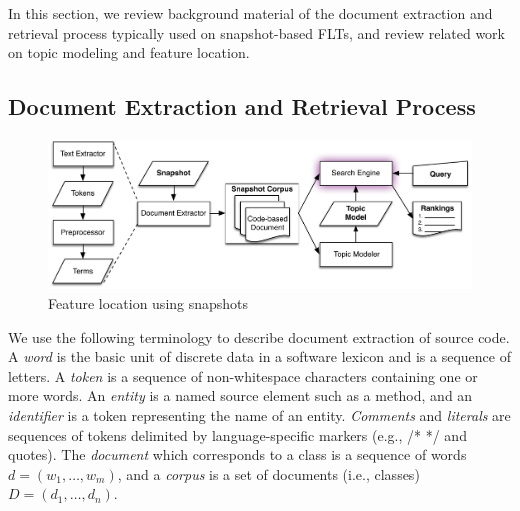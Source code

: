 

In this section, we review background material of the document extraction and retrieval process
typically used on snapshot-based FLTs,
and review related work on topic modeling and feature location.

\subsection{Document Extraction and Retrieval Process}

\begin{figure}
\vspace{2mm}
\centerline{\includegraphics[width=.75\textwidth]{figures/snapshot-flt}}
\caption{Feature location using snapshots}
\label{fig:snapshot}
\vspace{-2mm}
\end{figure}

We use the following terminology to describe document extraction of source code.
A \textit{word} is the basic unit of discrete data in a software lexicon and is a sequence of letters.
A \textit{token} is a sequence of non-whitespace characters containing one or more words.
An \textit{entity} is a named source element such as a method,
and an \textit{identifier} is a token representing the name of an entity.
\textit{Comments} and \textit{literals} are sequences of tokens delimited by language-specific markers (e.g., /* */ and quotes).
The \textit{document} which corresponds to a class is a sequence of words $d = (w_1, \ldots, w_m)$,
and a \textit{corpus} is a set of documents (i.e., classes) $D = (d_1, \ldots, d_n)$.

